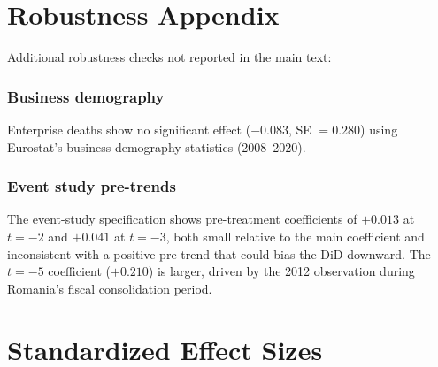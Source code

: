 \documentclass[12pt]{article}
\begin{document}
\section{Robustness Appendix}

Additional robustness checks not reported in the main text:

\subsubsection*{Business demography} Enterprise deaths show no significant effect ($-0.083$, SE $= 0.280$) using Eurostat's business demography statistics (2008--2020).

\subsubsection*{Event study pre-trends} The event-study specification shows pre-treatment coefficients of $+0.013$ at $t = -2$ and $+0.041$ at $t = -3$, both small relative to the main coefficient and inconsistent with a positive pre-trend that could bias the DiD downward. The $t = -5$ coefficient ($+0.210$) is larger, driven by the 2012 observation during Romania's fiscal consolidation period.

\section{Standardized Effect Sizes}
\label{sec:sde}


\end{document}
